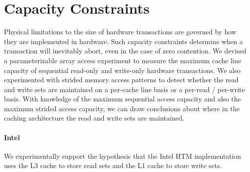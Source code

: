 \section{Capacity Constraints}
\label{sec:capacity}
Physical limitations to the size of hardware 
transactions are
governed by how they are implemented in hardware. 
Such capacity constraints
determine when a transaction will inevitably abort, 
even in the case of zero contention. We 
devised a parameterizable array access
experiment to measure the maximum cache line capacity 
of sequential read-only and write-only
hardware transactions. We also experimented with strided 
memory access patterns
to detect whether the read and write sets are maintained
on a per-cache line basis or a per-read / per-write basis.
With knowledge of the maximum sequential access 
capacity and also the maximum
strided access capacity, we can draw conclusions 
about where in the caching
architecture the read and write sets are 
maintained. 

\paragraph{Intel}

We experimentally support the hypothesis
that the Intel HTM implementation uses the L3 cache to 
store read sets and the L1 cache to store write sets.

